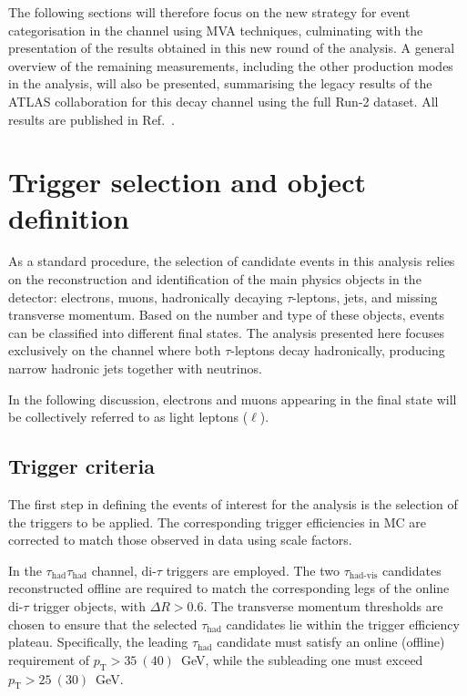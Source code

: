 The following sections will therefore focus on the new strategy for event categorisation in the \ttH channel using MVA techniques, culminating with the presentation of the results obtained in this new round of the \ttHtt analysis. A general overview of the remaining measurements, including the other production modes in the \htautau analysis, will also be presented, summarising the legacy results of the ATLAS collaboration for this decay channel using the full Run-2 dataset. All results are published in Ref.~\cite{differential_htautau}.

\section{Trigger selection and object definition}
\label{sec:object_definiton}

As a standard procedure, the selection of candidate events in this analysis relies on the reconstruction and identification of the main physics objects in the detector: electrons, muons, hadronically decaying $\tau$-leptons, jets, and missing transverse momentum. Based on the number and type of these objects, events can be classified into different final states. The analysis presented here focuses exclusively on the channel where both $\tau$-leptons decay hadronically, producing narrow hadronic jets together with neutrinos.  

In the following discussion, electrons and muons appearing in the final state will be collectively referred to as light leptons ($\ell$).

\subsection{Trigger criteria}
\label{subsec:trigger_tth}

The first step in defining the events of interest for the analysis is the selection of the triggers to be applied. The corresponding trigger efficiencies in MC are corrected to match those observed in data using scale factors.  

In the $\tau_{\text{had}}\tau_{\text{had}}$ channel, di-$\tau$ triggers are employed. The two $\tau_{\text{had-vis}}$ candidates reconstructed offline are required to match the corresponding legs of the online di-$\tau$ trigger objects, with $\Delta R > 0.6$. The transverse momentum thresholds are chosen to ensure that the selected $\tau_{\text{had}}$ candidates lie within the trigger efficiency plateau. Specifically, the leading $\tau_{\text{had}}$ candidate must satisfy an online (offline) requirement of $p_{\text{T}} > 35~(40)$~GeV, while the subleading one must exceed $p_{\text{T}} > 25~(30)$~GeV.  

